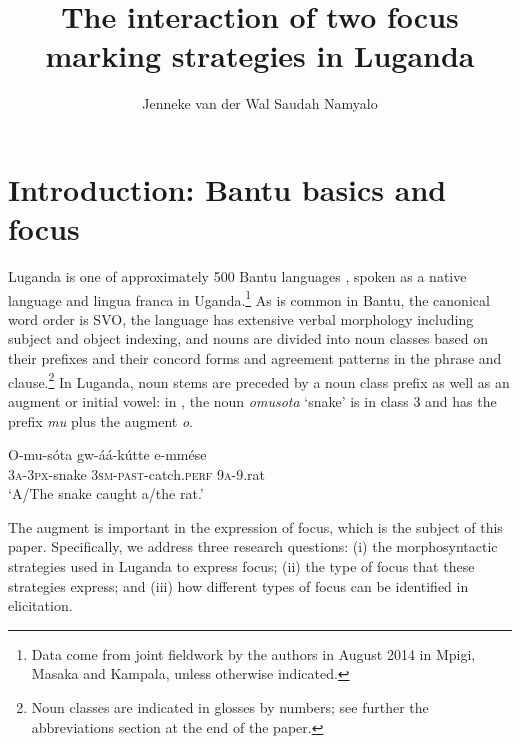 \documentclass[output=paper]{langsci/langscibook}
\title{The interaction of two focus marking strategies in Luganda}
\author{%
Jenneke van der Wal \affiliation{University of Cambridge}\lastand 
 Saudah Namyalo \affiliation{Makerere University}
}
\begin{document}
 
 
%



\section{Introduction: Bantu basics and focus}\label{sec:vanderwal:1}

Luganda is one of approximately 500 Bantu languages \citep[4]{NursePhilippson2003}, spoken as a native language and lingua franca in Uganda.\footnote{Data come from joint fieldwork by the authors in August 2014 in Mpigi, Masaka and Kampala, unless otherwise indicated.}{} As is common in Bantu, the canonical word order is SVO, the language has extensive verbal morphology including subject and object indexing, and nouns are divided into noun classes based on their prefixes and their concord forms and agreement patterns in the phrase and clause.\footnote{Noun classes are indicated in glosses by numbers; see further the abbreviations section at the end of the paper.}{} In Luganda, noun stems are preceded by a noun class prefix as well as an augment or initial vowel: in , the noun \textit{omusota} ‘snake’ is in class 3 and has the prefix \textit{mu} plus the augment \textit{o}. 

\ea\label{ex:vanderwal:1}
\gll O-mu-sóta  gw-áá-kútte      e-mmése\\
     \textsc{3a}-\textsc{3px}-snake  \textsc{3sm}-\textsc{past}-catch.\textsc{perf}  \textsc{9a}-9.rat\\
\glt ‘A/The snake caught a/the rat.’
\z

The augment is important in the expression of focus, which is the subject of this paper. Specifically, we address three research questions: 
(i) the morphosyntactic strategies used in Luganda to express focus; 
(ii) the type of focus that these strategies express; 
and (iii) how different types of focus can be identified in elicitation.
\end{document}
